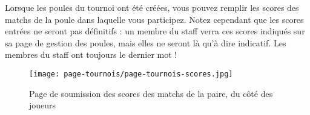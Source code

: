 Lorsque les poules du tournoi ont été créées, vous pouvez remplir les scores
des matchs de la poule dans laquelle vous participez. Notez cependant que
les scores entrées ne seront pas définitifs : un membre du staff verra ces
scores indiqués sur sa page de gestion des poules, mais elles ne seront
là qu'à dire indicatif. Les membres du staff ont toujours le dernier mot !

\begin{figure}[H]
\centering
\texttt{[image: page-tournois/page-tournois-scores.jpg]}
\caption{Page de soumission des scores des matchs de la paire, du côté des joueurs}
\end{figure}